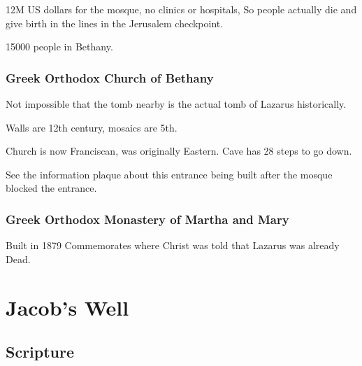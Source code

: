 \documentclass[letterpaper]{report}
\begin{document}
12M US dollars for the mosque, no clinics or hospitals, So people actually die and give birth in the lines in the Jerusalem checkpoint.

15000 people in Bethany.

\subsubsection{Greek Orthodox Church of Bethany}

Not impossible that the tomb nearby is the actual tomb of Lazarus historically.

Walls are 12th century, mosaics are 5th.

Church is now Franciscan, was originally Eastern.
Cave has 28 steps to go down.

See the information plaque about this entrance being built after the mosque blocked the entrance.

\subsubsection{Greek Orthodox Monastery of Martha and Mary}
Built in 1879
Commemorates where Christ was told that Lazarus was already Dead.

\clearpage
\section{Jacob's Well}
\begin{multicols}{2}
	\mbox{}
\end{multicols}
\subsection{Scripture}
\end{document}
